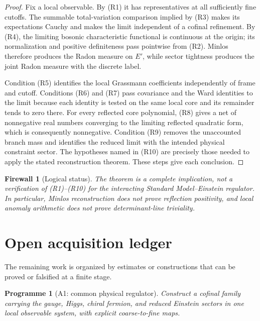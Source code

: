 \documentclass[11pt]{article}
\newtheorem{firewall}[theorem]{Firewall}
\newtheorem{programme}[theorem]{Programme}
\begin{document}
\begin{proof}
Fix a local observable.  By (R1) it has representatives at all sufficiently
fine cutoffs.  The summable total-variation comparison implied by (R3)
makes its expectations Cauchy and makes the limit independent of a
cofinal refinement.  By (R4), the limiting bosonic characteristic
functional is continuous at the origin; its normalization and positive
definiteness pass pointwise from (R2).  Minlos therefore produces the
Radon measure on \(E'\), while sector tightness produces the joint Radon
measure with the discrete label.

Condition (R5) identifies the local Grassmann coefficients independently
of frame and cutoff.  Conditions (R6) and (R7) pass covariance and the
Ward identities to the limit because each identity is tested on the same
local core and its remainder tends to zero there.  For every reflected
core polynomial, (R8) gives a net of nonnegative real numbers converging to
the limiting reflected quadratic form, which is consequently
nonnegative.  Condition (R9) removes the unaccounted branch mass and
identifies the reduced limit with the intended physical constraint
sector.  The hypotheses named in (R10) are precisely those needed to apply
the stated reconstruction theorem.  These steps give each conclusion.
\end{proof}

\begin{firewall}[Logical status]
\label{fw:v11v1-logical-status}
The theorem is a complete implication, not a verification of (R1)--(R10)
for the interacting Standard Model--Einstein regulator.  In particular,
Minlos reconstruction does not prove reflection positivity, and local
anomaly arithmetic does not prove determinant-line triviality.
\end{firewall}

\section{Open acquisition ledger}
\label{sec:v11v1-ledger}

The remaining work is organized by estimates or constructions that can be
proved or falsified at a finite stage.

\begin{programme}[A1: common physical regulator]
\label{prog:v11v1-a1}
Construct a cofinal family carrying the gauge, Higgs, chiral fermion, and
reduced Einstein sectors in one local observable system, with explicit
coarse-to-fine maps.
\end{programme}
\end{document}
